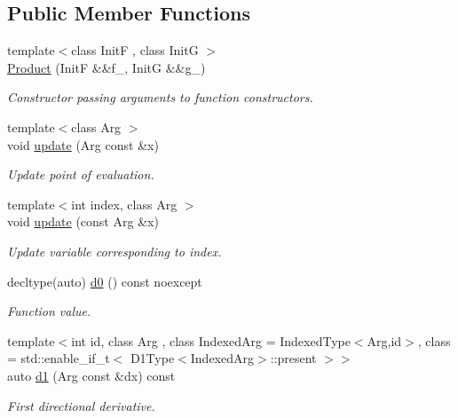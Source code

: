 \subsection*{Public Member Functions}
\begin{DoxyCompactItemize}
\item 
{\footnotesize template$<$class InitF , class InitG $>$ }\\\hyperlink{structFunG_1_1MathematicalOperations_1_1Product_ade95a856ff3ff32f6e6aea2177478589}{Product} (InitF \&\&f\+\_\+, InitG \&\&g\+\_\+)
\begin{DoxyCompactList}\small\item\em Constructor passing arguments to function constructors. \end{DoxyCompactList}\item 
{\footnotesize template$<$class Arg $>$ }\\void \hyperlink{structFunG_1_1MathematicalOperations_1_1Product_a5b45c1bac06651ee5b6ea79fb5128ef9}{update} (Arg const \&x)
\begin{DoxyCompactList}\small\item\em Update point of evaluation. \end{DoxyCompactList}\item 
{\footnotesize template$<$int index, class Arg $>$ }\\void \hyperlink{structFunG_1_1MathematicalOperations_1_1Product_a8db3d935bbe273c0436ff3bc6bb6b786}{update} (const Arg \&x)
\begin{DoxyCompactList}\small\item\em Update variable corresponding to index. \end{DoxyCompactList}\item 
decltype(auto) \hyperlink{structFunG_1_1MathematicalOperations_1_1Product_a2dcd0cd8b29911b24ee830b8aaa6441c}{d0} () const noexcept
\begin{DoxyCompactList}\small\item\em Function value. \end{DoxyCompactList}\item 
{\footnotesize template$<$int id, class Arg , class Indexed\+Arg  = Indexed\+Type$<$\+Arg,id$>$, class  = std\+::enable\+\_\+if\+\_\+t$<$ D1\+Type$<$\+Indexed\+Arg$>$\+::present $>$$>$ }\\auto \hyperlink{structFunG_1_1MathematicalOperations_1_1Product_aea69feaac16f79717a85d7b089a80f8f}{d1} (Arg const \&dx) const 
\begin{DoxyCompactList}\small\item\em First directional derivative. \end{DoxyCompactList}\item 

\end{DoxyCompactItemize}
